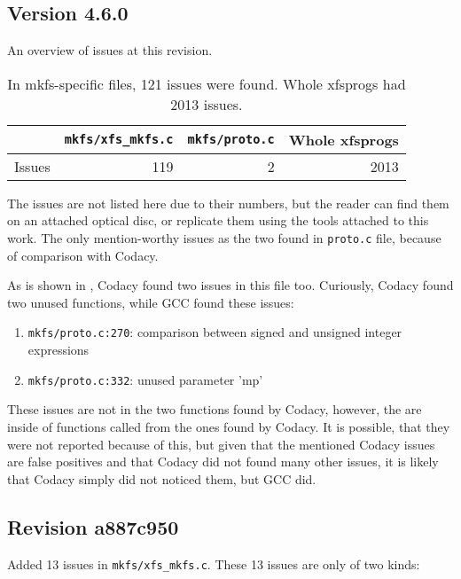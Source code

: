 \subsection{Version 4.6.0}\label{chap:results:gcc:4.6}

An overview of issues at this revision.
\begin{table}[h]
\begin{tabular}{|l||r|r||r|}
\hline
& {\tt mkfs/xfs\_mkfs.c} & {\tt mkfs/proto.c} & Whole xfsprogs \\
\hline
Issues & 119 & 2 & 2013 \\
\hline
\end{tabular}
\caption{In mkfs-specific files, 121 issues were found. Whole
xfsprogs had 2013 issues.}
\end{table}

The issues are not listed here due to their numbers, but the reader can
find them on an attached optical disc, or replicate them using the tools
attached to this work. The only mention-worthy issues as the two found in
{\tt proto.c} file, because of comparison with Codacy.

As is shown in , Codacy found two issues in
this file too. Curiously, Codacy found two unused functions, while GCC
found these issues:
\begin{enumerate}
	\item {\tt mkfs/proto.c:270}: comparison between signed and unsigned integer expressions
	\item {\tt mkfs/proto.c:332}: unused parameter 'mp'
\end{enumerate}

These issues are not in the two functions found by Codacy, however, the are
inside of functions called from the ones found by Codacy. It is possible,
that they were not reported because of this, but given that the mentioned
Codacy issues are false positives and that Codacy did not found many other
issues, it is likely that Codacy simply did not noticed them, but GCC did.

\subsection{Revision a887c950}\label{chap:results:gcc:a887c950}
Added 13 issues in {\tt mkfs/xfs\_mkfs.c}. These 13 issues are only of two
kinds:

